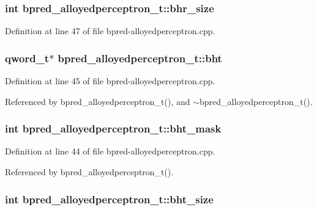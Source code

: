 \subsubsection[{bhr\_\-size}]{\setlength{\rightskip}{0pt plus 5cm}int {\bf bpred\_\-alloyedperceptron\_\-t::bhr\_\-size}\hspace{0.3cm}{\tt  [protected]}}\label{classbpred__alloyedperceptron__t_2ea7ec17b15e1128345da8e53d1bf8d9}




Definition at line 47 of file bpred-alloyedperceptron.cpp.
\subsubsection[{bht}]{\setlength{\rightskip}{0pt plus 5cm}qword\_\-t$\ast$ {\bf bpred\_\-alloyedperceptron\_\-t::bht}\hspace{0.3cm}{\tt  [protected]}}\label{classbpred__alloyedperceptron__t_be3f7ee98a14b7c516a7ec51ab1f6836}




Definition at line 45 of file bpred-alloyedperceptron.cpp.

Referenced by bpred\_\-alloyedperceptron\_\-t(), and $\sim$bpred\_\-alloyedperceptron\_\-t().
\subsubsection[{bht\_\-mask}]{\setlength{\rightskip}{0pt plus 5cm}int {\bf bpred\_\-alloyedperceptron\_\-t::bht\_\-mask}\hspace{0.3cm}{\tt  [protected]}}\label{classbpred__alloyedperceptron__t_1c054788b15d19d019e00a4f111798f3}




Definition at line 44 of file bpred-alloyedperceptron.cpp.

Referenced by bpred\_\-alloyedperceptron\_\-t().
\subsubsection[{bht\_\-size}]{\setlength{\rightskip}{0pt plus 5cm}int {\bf bpred\_\-alloyedperceptron\_\-t::bht\_\-size}\hspace{0.3cm}{\tt  [protected]}}\label{classbpred__alloyedperceptron__t_08f9d533a998b87af1c979a522cf175d}




